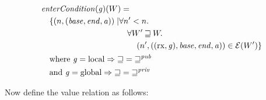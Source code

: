 \documentclass[compsoc,conference,letterpaper,fleqn]{IEEEtran}
\newcommand{\var}[1]{\mathit{#1}}
\newcommand{\gl}{\var{g}}
\newcommand{\addr}{\var{a}}
\newcommand{\start}{\var{base}}
\newcommand{\addrend}{\var{end}}
\newcommand{\plainfun}[2]{
  \ifthenelse{\equal{#2}{}}
  {\mathit{#1}}
  {\mathit{#1}(#2)}
}
\newcommand{\entryCond}[1]{\plainfun{enterCondition}{#1}}
\newcommand{\future}{\mathbin{\sqsupseteq}}
\newcommand{\futurewk}{\mathbin{\sqsupseteq}^{\var{pub}}}
\newcommand{\futurestr}{\mathbin{\sqsupseteq}^{\var{priv}}}
\newcommand{\asmType}{\plaindom{AsmType}}
\newcommand{\plaindom}[1]{\mathrm{#1}}
\newcommand{\intr}[2]{\mathcal{#1}}
\newcommand{\exprintr}[1]{\intr{E}{#1}}
\newcommand{\stder}{\exprintr{\asmType}}
\newcommand{\npair}[2][n]{\left(#1,#2 \right)}
\newcommand{\plainperm}[1]{\mathrm{#1}}
\newcommand{\exec}{\plainperm{rx}}
\newcommand{\local}{\plainperm{local}}
\newcommand{\glob}{\plainperm{global}}
\begin{document}
\begin{align*}
  & \entryCond{}(\gl)(W) = \\
  & \quad
    \begin{aligned}[t]
      \{ \npair{(\start,\addrend,\addr)} \mid &  \forall n' < n \ldotp\\
      & \quad \forall W' \future W \ldotp\\
      & \qquad \npair[n']{((\exec,\gl),\start,\addrend,\addr)} \in \stder(W')\}
    \end{aligned} \\
  & \quad \text{where } \gl = \local \Rightarrow \future = \futurewk \\
  & \quad \text{and } \gl = \glob \Rightarrow \future = \futurestr
\end{align*}

Now define the value relation as follows:
\end{document}
